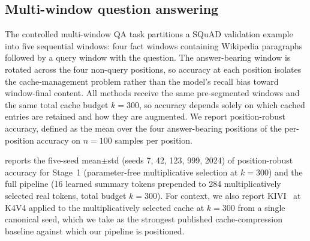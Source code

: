 
\subsection{Multi-window question answering}\label{sec:squad}

The controlled multi-window QA task partitions a SQuAD validation example into five sequential windows: four fact windows containing Wikipedia paragraphs followed by a query window with the question. The answer-bearing window is rotated across the four non-query positions, so accuracy at each position isolates the cache-management problem rather than the model's recall bias toward window-final content. All methods receive the same pre-segmented windows and the same total cache budget $k{=}300$, so accuracy depends solely on which cached entries are retained and how they are augmented. We report position-robust accuracy, defined as the mean over the four answer-bearing positions of the per-position accuracy on $n{=}100$ samples per position.

 reports the five-seed mean$\pm$std (seeds 7, 42, 123, 999, 2024) of position-robust accuracy for Stage~1 (parameter-free multiplicative selection at $k{=}300$) and the full pipeline (16 learned summary tokens prepended to 284 multiplicatively selected real tokens, total budget $k{=}300$). For context, we also report KIVI~\cite{liu2024kivi} at K4V4 applied to the multiplicatively selected cache at $k{=}300$ from a single canonical seed, which we take as the strongest published cache-compression baseline against which our pipeline is positioned.

